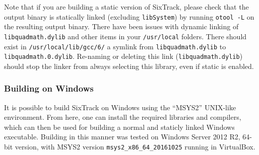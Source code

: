 \documentclass[english,BCOR=0mm,DIV=18]{scrartcl}
\begin{document}

Note that if you are building a static version of SixTrack, please check that the output binary is statically linked (excluding \texttt{libSystem}) by running \texttt{otool -L} on the resulting output binary.
There have been issues with dynamic linking of \texttt{libquadmath.dylib} and other items in your \texttt{/usr/local} folders.
There should exist in \texttt{/usr/local/lib/gcc/6/} a symlink from \texttt{libquadmath.dylib} to \texttt{libquadmath.0.dylib}.
Re-naming or deleting this link (\texttt{libquadmath.dylib}) should stop the linker from always selecting this library, even if static is enabled.

\subsubsection{Building on Windows}

It is possible to build SixTrack on Windows using the ``MSYS2'' UNIX-like environment.
From here, one can install the required libraries and compilers, which can then be used for building a normal and staticly linked Windows executable.
Building in this manner was tested on Windows Server 2012 R2, 64-bit version, with MSYS2 version \texttt{msys2\_x86\_64\_20161025} running in VirtualBox.
\end{document}
